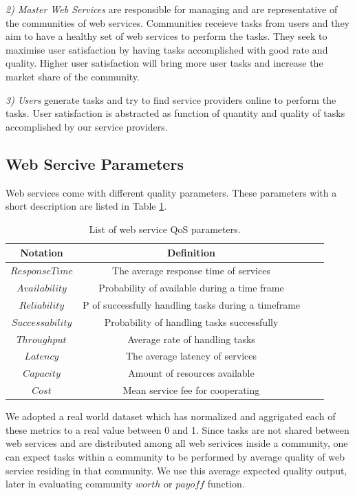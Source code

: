 \documentclass[10pt, conference, compsocconf]{IEEEtran}
\theoremstyle{plain}
\theoremstyle{definition}
\begin{document}
\emph{2) Master Web Services} are responsible for managing and are representative of the communities of web services. Communities receieve tasks from users and they aim to have a healthy set of web services to perform the tasks. They seek to maximise user satisfaction by having tasks accomplished with good rate and quality. Higher user satisfaction will bring more user tasks and increase the market share of the community.

\emph{3) Users} generate tasks and try to find service providers online to perform the tasks. User satisfaction is abstracted as function of quantity and quality of tasks accomplished by our service providers.

\subsection{Web Sercive Parameters}

Web services come with different quality parameters. These parameters with a short description are listed in Table \ref{qosws}.

\begin{table}[!t]
\centering
\caption{List of web service QoS parameters.}
\begin{tabular}{|c|c||c|c|}
\hline
\textbf{Notation} & \textbf{Definition} \\
\hline\hline
$Response Time$ & The average response time of services\\
$Availability$ & Probability of available during a time frame \\
$Reliability$ & P of successfully handling tasks during a timeframe\\
$Successability$ & Probability of handling tasks successfully \\
$Throughput$ & Average rate of handling tasks \\
$Latency$ & The average latency of services\\
$Capacity$ & Amount of resources available\\
$Cost$ & Mean service fee for cooperating \\
\hline
\end{tabular}
\label{qosws}
\end{table}

We adopted a real world dataset \cite{DBLP:conf/smc/Al-MasriM09a} which has normalized and aggrigated each of these metrics to a real value between 0 and 1. Since tasks are not shared between web services and are distributed among all web serivices inside a community, one can expect tasks within a community to be performed by average quality of web service residing in that community. We use this average expected quality output, later in evaluating community $worth$ or $payoff$ function. 
\end{document}
